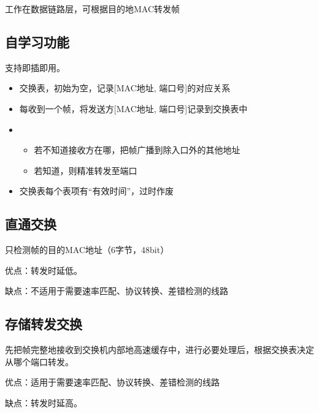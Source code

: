 工作在数据链路层，可根据目的地MAC转发帧


\subsection{自学习功能}
支持即插即用。

\begin{itemize}
    \item 交换表，初始为空，记录[MAC地址, 端口号]的对应关系
    \item 每收到一个帧，将发送方[MAC地址, 端口号]记录到交换表中
    \item \begin{itemize}
        \item 若不知道接收方在哪，把帧广播到除入口外的其他地址
        \item 若知道，则精准转发至端口
    \end{itemize}
    \item 交换表每个表项有“有效时间”，过时作废
\end{itemize}


\subsection{直通交换}
只检测帧的目的MAC地址（6字节，48bit）

优点：转发时延低。

缺点：不适用于需要速率匹配、协议转换、差错检测的线路


\subsection{存储转发交换}
先把帧完整地接收到交换机内部地高速缓存中，进行必要处理后，根据交换表决定从哪个端口转发。

优点：适用于需要速率匹配、协议转换、差错检测的线路

缺点：转发时延高。


